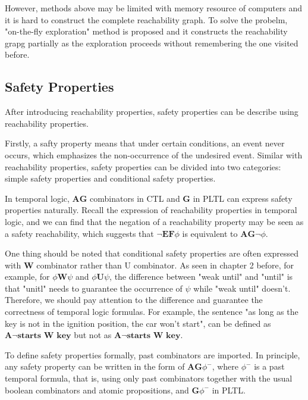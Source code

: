 \documentclass[10pt, conference]{IEEEtran}
\begin{document}
        However, methods above may be limited with memory resource of computers and it is hard to construct the complete reachability graph. To solve the probelm, "on-the-fly exploration" method is proposed and it constructs the reachability grapg partially as the exploration proceeds without remembering the one visited before.
        
        \subsection{Safety Properties}
        
        After introducing reachability properties, safety properties can be describe using reachability properties.
        
        Firstly, a safty property means that under certain conditions, an event
        never occurs, which emphasizes the non-occurrence of the undesired event. Similar with reachability properties, safety properties can be divided into two categories: simple safety properties and conditional safety properties.
        
        In temporal logic, $\textbf{AG}$ combinators in CTL and $\textbf{G}$ in PLTL can express safety properties naturally. Recall the expression of reachability properties in temporal logic, and we can find that the negation of a reachability property may be seen as a safety reachability, which suggests that $\neg\textbf{EF}\phi$ is equivalent to $\textbf{AG}\neg\phi$.
        
        One thing should be noted that conditional safety properties are often expressed with $\textbf{W}$ combinator rather than $\text{U}$ combinator. As seen in chapter 2 before, for example, for $\phi\textbf{W}\psi$ and $\phi\textbf{U}\psi$, the difference between "weak until" and "until" is that "unitl" needs to guarantee the occurrence of $\psi$ while "weak until" doesn't. Therefore, we should pay attention to the difference and guarantee the correctness of temporal logic formulas. For example, the sentence "as long as the key is not in the ignition position, the car won't start", can be defined as $\textbf{A}\neg\textbf{starts W key}$ but not as $\textbf{A}\neg\textbf{starts W key}$.
        
        To define safety properties formally, past combinators are imported. In principle, any safety property can be written in the form of $\textbf{AG}\phi^-$, where $\phi^-$ is a past temporal formula, that is, using only past combinators together with the usual boolean combinators and atomic propositions, and $\textbf{G}\phi^-$ in PLTL.
        
\end{document}
